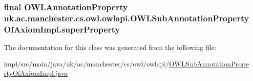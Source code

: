 \hypertarget{classuk_1_1ac_1_1manchester_1_1cs_1_1owl_1_1owlapi_1_1_o_w_l_sub_annotation_property_of_axiom_impl_ae0aeabf69e211c20a9e4e01244e3aa22}{
\subsubsection[{super\-Property}]{\setlength{\rightskip}{0pt plus 5cm}final {\bf O\-W\-L\-Annotation\-Property} uk.\-ac.\-manchester.\-cs.\-owl.\-owlapi.\-O\-W\-L\-Sub\-Annotation\-Property\-Of\-Axiom\-Impl.\-super\-Property\hspace{0.3cm}{\ttfamily [private]}}}\label{classuk_1_1ac_1_1manchester_1_1cs_1_1owl_1_1owlapi_1_1_o_w_l_sub_annotation_property_of_axiom_impl_ae0aeabf69e211c20a9e4e01244e3aa22}


The documentation for this class was generated from the following file\-:\begin{DoxyCompactItemize}
\item 
impl/src/main/java/uk/ac/manchester/cs/owl/owlapi/\hyperlink{_o_w_l_sub_annotation_property_of_axiom_impl_8java}{O\-W\-L\-Sub\-Annotation\-Property\-Of\-Axiom\-Impl.\-java}\end{DoxyCompactItemize}
